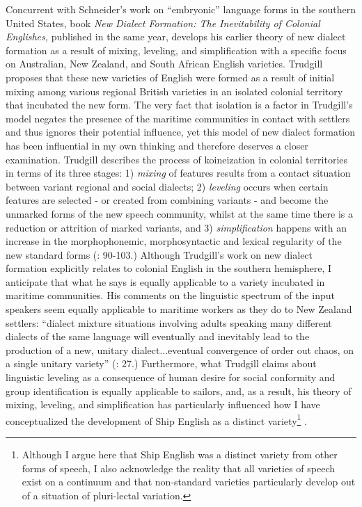 Concurrent with Schneider’s work on “embryonic” language forms in the southern United States,  book \textit{New Dialect Formation: The Inevitability of Colonial Englishes,} published in the same year, develops his earlier theory of new dialect formation as a result of mixing, leveling, and simplification with a specific focus on Australian, New Zealand, and South African English varieties. Trudgill proposes that these new varieties of English were formed as a result of initial mixing among various regional British varieties in an isolated colonial territory that incubated the new form. The very fact that isolation is a factor in Trudgill’s model negates the presence of the maritime communities in contact with settlers and thus ignores their potential influence, yet this model of new dialect formation has been influential in my own thinking and therefore deserves a closer examination. Trudgill describes the process of koineization in colonial territories in terms of its three stages: 1) \textit{mixing} of features results from a contact situation between variant regional and social dialects; 2) \textit{leveling} occurs when certain features are selected - or created from combining variants - and become the unmarked forms of the new speech community, whilst at the same time there is a reduction or attrition of marked variants, and 3) \textit{simplification} happens with an increase in the morphophonemic, morphosyntactic and lexical regularity of the new standard forms (\citealt{Trudgill1986}: 90-103.)  Although Trudgill’s work on new dialect formation explicitly relates to colonial English in the southern hemisphere, I anticipate that what he says is equally applicable to a variety incubated in maritime communities. His comments on the linguistic spectrum of the input speakers seem equally applicable to maritime workers as they do to New Zealand settlers: “dialect mixture situations involving adults speaking many different dialects of the same language will eventually and inevitably lead to the production of a new, unitary dialect...eventual convergence of order out chaos, on a single unitary variety” (\citealt{Trudgill2004}: 27.) Furthermore, what Trudgill claims about linguistic leveling as a consequence of human desire for social conformity and group identification is equally applicable to sailors, and, as a result, his theory of mixing, leveling, and simplification has particularly influenced how I have conceptualized the development of Ship English as a distinct variety\footnote{Although I argue here that Ship English was a distinct variety from other forms of speech, I also acknowledge the reality that all varieties of speech exist on a continuum and that non-standard varieties particularly develop out of a situation of pluri-lectal variation.} .

